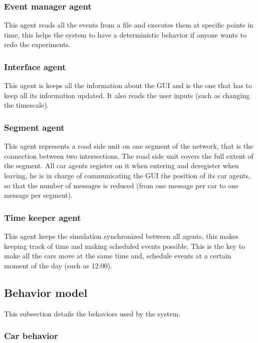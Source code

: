 \subsubsection{Event manager agent}

This agent reads all the events from a file and executes them at specific points in time, this helps the system to have a deterministic behavior if anyone wants to redo the experiments.

\subsubsection{Interface agent}

This agent is keeps all the information about the GUI and is the one that has to keep all its information updated. It also reads the user inputs (such as changing the timescale).

\subsubsection{Segment agent}

This agent represents a road side unit on one segment of the network, that is the connection between two intersections. The road side unit covers the full extent of the segment. All car agents register on it when entering and deregister when leaving, he is in charge of communicating the GUI the position of its car agents, so that the number of messages is reduced (from one message per car to one message per segment).

\subsubsection{Time keeper agent}

This agent keeps the simulation synchronized between all agents, this makes keeping track of time and making scheduled events possible. This is the key to make all the cars move at the same time and, schedule events at a certain moment of the day (such as 12:00).

\subsection{Behavior model}

This subsection details the behaviors used by the system.

\subsubsection{Car behavior}

